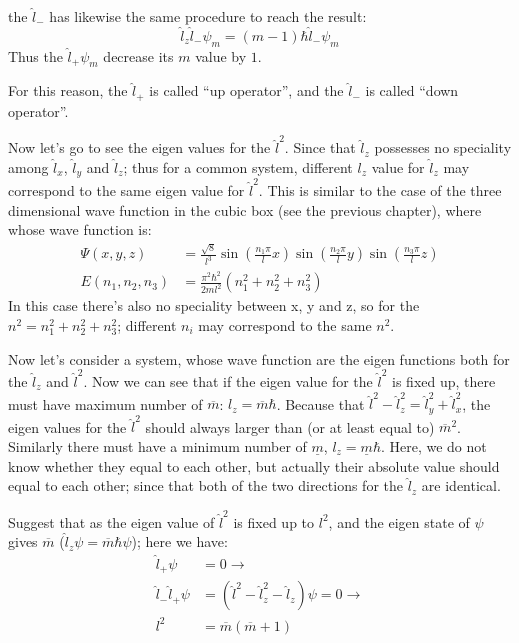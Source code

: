 the $\hat{l}_{-}$ has likewise the same procedure to reach the
result:
\begin{equation}\label{}
\hat{l}_{z}\hat{l}_{-}\psi_{m} = (m-1)\hbar\hat{l}_{-}\psi_{m}
\end{equation}
Thus the $\hat{l}_{+}\psi_{m}$ decrease its $m$ value by $1$.

For this reason, the $\hat{l}_{+}$ is called ``up operator'', and
the $\hat{l}_{-}$ is called ``down operator''.

Now let's go to see the eigen values for the $\hat{l}^{2}$. Since
that $\hat{l}_{z}$ possesses no speciality among $\hat{l}_{x}$,
$\hat{l}_{y}$ and $\hat{l}_{z}$; thus for a common system, different
$l_{z}$ value for $\hat{l}_{z}$ may correspond to the same eigen
value for $\hat{l}^{2}$. This is similar to the case of the three
dimensional wave function in the cubic box (see the previous
chapter), where whose wave function is:
\begin{align}\label{}
\Psi (x,y,z) &=
\frac{\sqrt{8}}{l^{3}}\sin\left(\frac{n_{1}\pi}{l}x\right)
\sin\left(\frac{n_{2}\pi}{l}y\right)
\sin\left(\frac{n_{3}\pi}{l}z\right) \nonumber \\
E (n_{1},n_{2},n_{3}) &=
\frac{\pi^{2}\hbar^{2}}{2ml^{2}}(n_{1}^{2}+n_{2}^{2}+n_{3}^{2})
\end{align}
In this case there's also no speciality between x, y and z, so for
the $n^{2} = n_{1}^{2}+n_{2}^{2}+n_{3}^{2}$; different $n_{i}$ may
correspond to the same $n^{2}$.

Now let's consider a system, whose wave function are the eigen
functions both for the $\hat{l}_{z}$ and $\hat{l}^{2}$.  Now we can
see that if the eigen value for the $\hat{l}^{2}$ is fixed up, there
must have maximum number of $\overline{m}$: $l_{z} =
\overline{m}\hbar$. Because that $\hat{l}^{2}-\hat{l}^{2}_{z} =
\hat{l}^{2}_{y} + \hat{l}^{2}_{x}$, the eigen values for the
$\hat{l}^{2}$ should always larger than (or at least equal to)
$\overline{m}^{2}$. Similarly there must have a minimum number of
$\underline{m}$, $l_{z} = \underline{m}\hbar$. Here, we do not know
whether they equal to each other, but actually their absolute value
should equal to each other; since that both of the two directions
for the $\hat{l}_{z}$ are identical.

Suggest that as the eigen value of $\hat{l}^{2}$ is fixed up to
$l^{2}$, and the eigen state of $\psi$ gives $\overline{m}$
($\hat{l}_{z}\psi = \overline{m}\hbar\psi$); here we have:
\begin{align}\label{}
\hat{l}_{+}\psi &= 0 \rightarrow \nonumber \\
\hat{l}_{-}\hat{l}_{+}\psi
&=(\hat{l}^{2}-\hat{l}_{z}^{2}-\hat{l}_{z})\psi= 0 \rightarrow \nonumber \\
l^{2} &= \overline{m}(\overline{m}+1)
\end{align}


